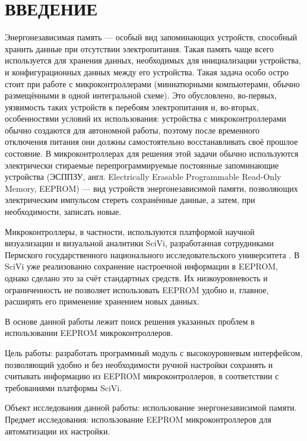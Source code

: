 \chapter*{ВВЕДЕНИЕ}

Энергонезависимая память --- особый вид запоминающих устройств, способный хранить данные при отсутствии электропитания.
Такая память чаще всего используется для хранения данных, необходимых для инициализации устройства, и конфигурационных данных между его устройства.
Такая задача особо остро стоит при работе с микроконтроллерами (миниатюрными компьютерами, обычно размещёнными в одной интегральной схеме). Это обусловлено, во-первых, уязвимость таких устройств к перебоям электропитания и, во-вторых, особенностями условий их использования: устройства с микроконтроллерами обычно создаются для автономной работы, поэтому после временного отключения питания они должны самостоятельно восстанавливать своё прошлое состояние.
В микроконтроллерах для решения этой задачи обычно используются электрически стираемые перепрограммируемые постоянные запоминающие устройства (ЭСППЗУ, англ. Electrically Erasable Programmable Read-Only Memory, EEPROM) --- вид устройств энергонезависимой памяти, позволяющих электрическим импульсом стереть сохранённые данные, а затем, при необходимости, записать новые.

Микроконтроллеры, в частности, используются платформой научной визуализации и визуальной аналитики SciVi, разработанная сотрудниками Пермского государственного национального исследовательского университета \cite{article:scivi}.
В SciVi уже реализованно сохранение настроечной информации в EEPROM, однако сделано это за счёт стандартных средств. Их низкоуровневость и ограниченность не позволяет использовать EEPROM удобно и, главное, расширять его применение хранением новых данных.

В основе данной работы лежит поиск решения указанных проблем в использовании EEPROM микроконтроллеров.

Цель работы: разработать программный модуль с высокоуровневым интерфейсом, позволяющий удобно и без необходимости ручной настройки сохранять и считывать информацию из EEPROM микроконтроллеров, в соответствии с требованиями платформы SciVi.

Объект исследования данной работы: использование энергонезависимой памяти.
Предмет исследования: использование EEPROM микроконтроллеров для автоматизации их настройки.

